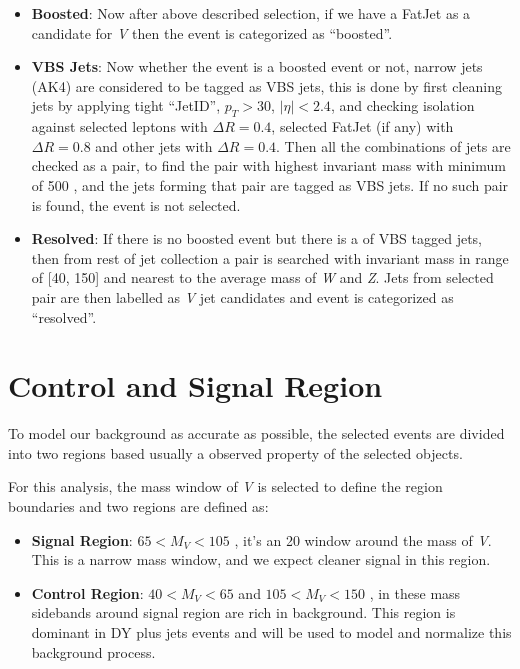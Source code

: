 \begin{itemize}
  \item \textbf{Boosted}: Now after above described selection,
        if we have a FatJet as a candidate for \textit{V} then the event is
        categorized as ``boosted''.
  \item \textbf{VBS Jets}: Now whether the event is a boosted event or not,
        narrow jets (AK4) are considered to be tagged as VBS jets,
        this is done by first cleaning jets by applying tight ``JetID'',
        \( p_T > 30 \), \( |\eta| < 2.4 \),
        and checking isolation against selected leptons with \(\Delta R = 0.4\),
        selected FatJet (if any) with \( \Delta R = 0.8 \)
        and other jets with \(\Delta R = 0.4\).
        Then all the combinations of jets are checked as a pair,
        to find the pair with highest invariant mass with minimum of 500 \GeV{},
        and the jets forming that pair are tagged as VBS jets.
        If no such pair is found, the event is not selected.
  \item \textbf{Resolved}: If there is no boosted event but there
        is a of VBS tagged jets, then from rest of jet collection a pair
        is searched with invariant mass in range of [40, 150] \GeV{} and
        nearest to the average mass of \textit{W} and \textit{Z}.
        Jets from selected pair are then labelled as \textit{V} jet candidates
        and event is categorized as ``resolved''.
\end{itemize}

\section{
  Control and Signal Region
 }

To model our background as accurate as possible,
the selected events are divided into two regions based usually
a observed property of the selected objects.

For this analysis, the mass window of \textit{V} is selected
to define the region boundaries and two regions are defined as:

\begin{itemize}
  \item \textbf{Signal Region}: \( 65 < M_{V} < 105 \) \GeV{},
        it's an 20 \GeV{} window around the mass of \textit{V}. This is a
        narrow mass window, and we expect cleaner signal in this region.
  \item \textbf{Control Region}: \( 40 < M_{V} < 65 \) and \( 105 < M_{V} < 150 \) \GeV{},
        in these mass sidebands around signal region are rich
        in background. This region is dominant in \gls{DY} plus jets
        events and will be used to model and normalize this background process.
\end{itemize}

